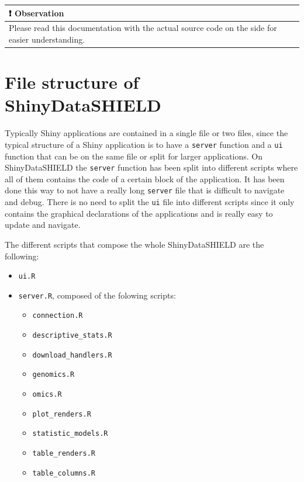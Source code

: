 \documentclass[
]{book}
\providecommand{\tightlist}{%
  \setlength{\itemsep}{0pt}\setlength{\parskip}{0pt}}
\begin{document}
\begin{longtable}[]{@{}
  >{\raggedright\arraybackslash}p{}@{}}
\toprule
❗ Observation \\
\midrule
\endhead
Please read this documentation with the actual source code on the side for easier understanding. \\
\bottomrule
\end{longtable}

\hypertarget{file-structure-of-shinydatashield}{%
\section{File structure of ShinyDataSHIELD}\label{file-structure-of-shinydatashield}}

Typically Shiny applications are contained in a single file or two files, since the typical structure of a Shiny application is to have a \texttt{server} function and a \texttt{ui} function that can be on the same file or split for larger applications. On ShinyDataSHIELD the \texttt{server} function has been split into different scripts where all of them contains the code of a certain block of the application. It has been done this way to not have a really long \texttt{server} file that is difficult to navigate and debug. There is no need to split the \texttt{ui} file into different scripts since it only contains the graphical declarations of the applications and is really easy to update and navigate.

The different scripts that compose the whole ShinyDataSHIELD are the following:

\begin{itemize}
\tightlist
\item
  \texttt{ui.R}
\item
  \texttt{server.R}, composed of the folowing scripts:

  \begin{itemize}
  \tightlist
  \item
    \texttt{connection.R}
  \item
    \texttt{descriptive\_stats.R}
  \item
    \texttt{download\_handlers.R}
  \item
    \texttt{genomics.R}
  \item
    \texttt{omics.R}
  \item
    \texttt{plot\_renders.R}
  \item
    \texttt{statistic\_models.R}
  \item
    \texttt{table\_renders.R}
  \item
    \texttt{table\_columns.R}
  \end{itemize}
\end{itemize}
\end{document}
